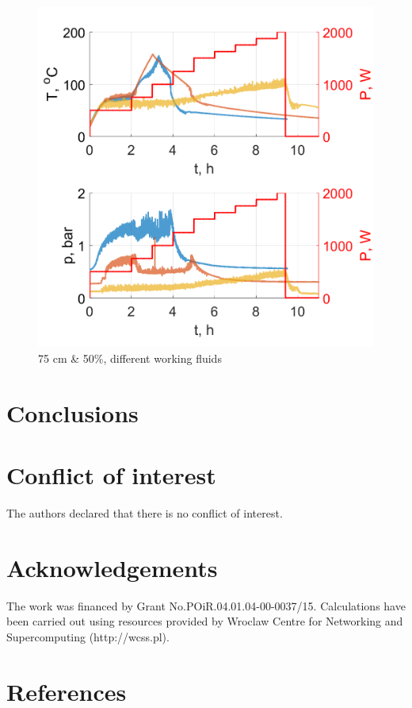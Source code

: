 \documentclass[article]{elsarticle}
\begin{document}
\begin{figure}[h]
\centering
\includegraphics[width=1\textwidth]{figures/AcetonEtanolWoda75cm_2.png}
\caption{75 cm \& 50\%, different working fluids}
\label{jdm1}
\end{figure}


\label{sec:resdis}
\section{Conclusions}
\section*{Conflict of interest}
The authors declared that there is no conflict of interest. 
\section*{Acknowledgements}
The work was financed by Grant No.POiR.04.01.04-00-0037/15. Calculations have been carried out using resources provided by Wroclaw Centre for Networking and Supercomputing (http://wcss.pl).

\section*{References} 


\end{document}
